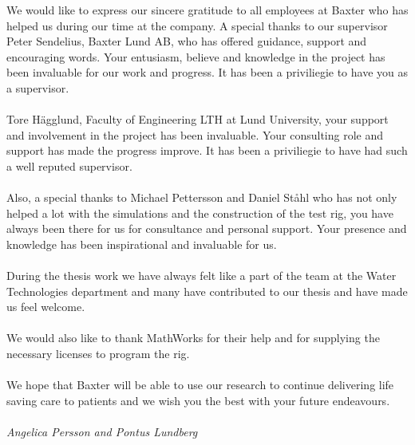 We would like to express our sincere gratitude to all employees at Baxter who has helped us during our time at the company. A special thanks to our supervisor Peter Sendelius, Baxter Lund AB, who has offered guidance, support and encouraging words. Your entusiasm, believe and knowledge in the project has been invaluable for our work and progress. It has been a priviliegie to have you as a supervisor.\\
\\
Tore Hägglund, Faculty of Engineering LTH at Lund University, your support and involvement in the project has been invaluable. Your consulting role and support has made the progress improve. It has been a priviliegie to have had such a well reputed supervisor.\\
\\
Also, a special thanks to Michael Pettersson and Daniel Ståhl who has not only helped a lot with the simulations and the construction of the test rig, you have always been there for us for consultance and personal support. Your presence and knowledge has been inspirational and invaluable for us. \\
\\
During the thesis work we have always felt like a part of the team at the Water Technologies department and many have contributed to our thesis and have made us feel welcome. \\
\\
We would also like to thank MathWorks for their help and for supplying the necessary licenses to program the rig.\\
\\
We hope that Baxter will be able to use our research to continue delivering life saving care to patients and we wish you the best with your future endeavours. \\
\\

\textit{Angelica Persson and Pontus Lundberg}